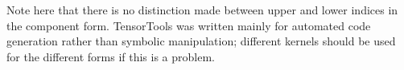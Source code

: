 \documentclass{report}
\newcommand{\mathdialogue}[2]
{
  \begin{center}
  \begin{tabular}[t]{rl}
  {\tt In := } & \parbox{10cm}{\tt {#1}} \\
\\
  {\tt Out = } & \parbox{10cm}{#2} \\
  \end{tabular}
  \end{center}
}
\newcommand{\mathinput}[1]
{
  \begin{tt}
  \begin{center}
    #1
  \end{center}
  \end{tt}
}
\begin{document}
Note here that there is no distinction made between upper and lower
indices in the component form.  TensorTools was written mainly for
automated code generation rather than symbolic manipulation; different
kernels should be used for the different forms if this is a problem.




\end{document}
